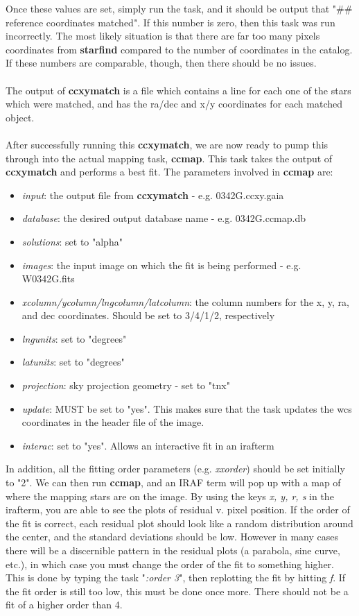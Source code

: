 \documentclass[a4paper]{article}
\begin{document}
Once these values are set, simply run the task, and it should be output that "\#\# reference coordinates matched".  If this number is zero, then this task was run incorrectly.  The most likely situation is that there are far too many pixels coordinates from \textbf{starfind} compared to the number of coordinates in the catalog.  If these numbers are comparable, though, then there should be no issues. 
\\ \\
The output of \textbf{ccxymatch} is a file which contains a line for each one of the stars which were matched, and has the ra/dec and x/y coordinates for each matched object. \\ \\
After successfully running this \textbf{ccxymatch}, we are now ready to pump this through into the actual mapping task, \textbf{ccmap}.  This task takes the output of \textbf{ccxymatch} and performs a best fit.  The parameters involved in \textbf{ccmap} are: 
\begin{itemize}
    \item \textit{input}: the output file from \textbf{ccxymatch} - e.g. 0342G.ccxy.gaia
    \item \textit{database}: the desired output database name - e.g. 0342G.ccmap.db
    \item \textit{solutions}: set to "alpha"
    \item \textit{images}: the input image on which the fit is being performed - e.g. W0342G.fits
    \item \textit{xcolumn/ycolumn/lngcolumn/latcolumn}: the column numbers for the x, y, ra, and dec coordinates.  Should be set to 3/4/1/2, respectively
    \item \textit{lngunits}: set to "degrees"
    \item \textit{latunits}: set to "degrees"
    \item \textit{projection}: sky projection geometry - set to "tnx"
    \item \textit{update}: MUST be set to "yes".  This makes sure that the task updates the wcs coordinates in the header file of the image.
    \item \textit{interac}: set to "yes".  Allows an interactive fit in an irafterm
\end{itemize}
In addition, all the fitting order parameters (e.g. \textit{xxorder}) should be set initially to "2".  We can then run \textbf{ccmap}, and an IRAF term will pop up with a map of where the mapping stars are on the image.  By using the keys \textit{x, y, r, s} in the irafterm, you are able to see the plots of residual v. pixel position.  If the order of the fit is correct, each residual plot should look like a random distribution around the center, and the standard deviations should be low.  However in many cases there will be a discernible pattern in the residual plots (a parabola, sine curve, etc.), in which case you must change the order of the fit to something higher.  This is done by typing the task "\textit{:order 3}", then replotting the fit by hitting \textit{f}.  If the fit order is still too low, this must be done once more.  There should not be a fit of a higher order than 4. \\ \\
\end{document}
